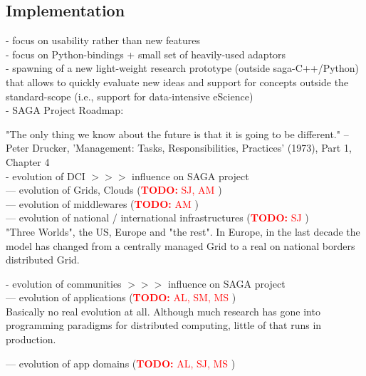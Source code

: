 \documentclass{article}
\newcommand{\B}[1]{\textbf{#1}}
\newcommand{\nind}{\noindent}
\newcommand{\todo}[1]{{\textcolor{red}{\B{TODO:} #1 }}}
\begin{document}
 \subsection{Implementation}
 - focus on usability rather than new features\\
 - focus on Python-bindings + small set of heavily-used adaptors\\
 - spawning of a new light-weight research prototype (outside saga-C++/Python) that allows to quickly evaluate new ideas and support for concepts outside the standard-scope (i.e., support for data-intensive eScience)\\


 \nind
 - SAGA Project Roadmap:\\

 
 \nind

 "The only thing we know about the future is that it is going to be
 different." -- Peter Drucker, 'Management: Tasks,
 Responsibilities, Practices' (1973), Part 1, Chapter 4\\ 


 - evolution of DCI $>>>$ influence on SAGA project\\
 --- evolution of Grids, Clouds (\todo{SJ, AM})\\
 --- evolution of middlewares (\todo{AM})\\
 --- evolution of national / international infrastructures (\todo{SJ})\\

"Three Worlds", the US, Europe and "the rest".
In Europe, in the last decade the model has changed from a centrally managed Grid to a real on national borders distributed Grid.

 
 \nind
 - evolution of communities  $>>>$ influence on SAGA project\\
 --- evolution of applications (\todo{AL, SM, MS})\\
 
Basically no real evolution at all. Although much research has gone into programming paradigms for distributed computing, little of that runs in production.
 
 --- evolution of app domains (\todo{AL, SJ, MS})\\
 
\end{document}
